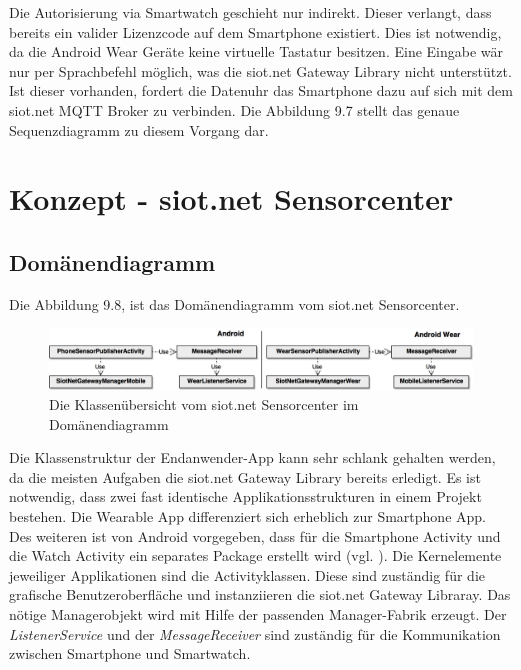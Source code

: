 Die Autorisierung via Smartwatch geschieht nur indirekt. Dieser verlangt, dass bereits ein valider Lizenzcode auf dem Smartphone existiert. Dies ist notwendig, da die Android Wear Geräte keine virtuelle Tastatur besitzen. Eine Eingabe wär nur per Sprachbefehl möglich, was die siot.net Gateway Library nicht unterstützt. Ist dieser vorhanden, fordert die Datenuhr das Smartphone dazu auf sich mit dem siot.net \gls{MQTT} Broker zu verbinden. Die Abbildung 9.7 stellt das genaue Sequenzdiagramm zu diesem Vorgang dar.
\section{Konzept - siot.net Sensorcenter}
\subsection{Domänendiagramm}
Die Abbildung 9.8, ist das Domänendiagramm vom siot.net Sensorcenter.
\begin{figure}[H]
  \centering
  \includegraphics[scale=0.25]{98_Bilder/09_Konzept/DomaindiagrammSiotNetSensorcenter}
  \caption[siot.net Sensorcenter Domänendiagramm]{Die Klassenübersicht vom siot.net Sensorcenter im Domänendiagramm}
\end{figure}
Die Klassenstruktur der Endanwender-App kann sehr schlank gehalten werden, da die meisten Aufgaben die siot.net Gateway Library bereits erledigt. Es ist notwendig, dass zwei fast identische Applikationsstrukturen in einem Projekt bestehen. Die Wearable App differenziert sich erheblich zur Smartphone App. Des weiteren ist von Android vorgegeben, dass für die Smartphone Activity und die Watch Activity ein separates Package erstellt wird (vgl. \cite{deva:mpas}). Die Kernelemente jeweiliger Applikationen sind die Activityklassen. Diese sind zuständig für die grafische Benutzeroberfläche und instanziieren die siot.net Gateway Libraray. Das nötige Managerobjekt wird mit Hilfe der passenden Manager-Fabrik erzeugt. Der \textit{ListenerService} und der \textit{MessageReceiver} sind zuständig für die Kommunikation zwischen Smartphone und Smartwatch.
